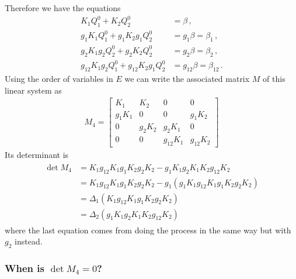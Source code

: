 Therefore we have the equations
\begin{align}
	 K_1 Q_1^0 +  K_2 Q_2^0 &= \beta\,,\\
	 g_1K_1 Q_1^0 + g_1K_2 g_1Q_2^0 &= g_1\beta = \beta_1\,,\\
	 g_2K_1 g_2Q_2^0 + g_2K_2 Q_2^0 &= g_2\beta = \beta_2\,,\\
	 g_{12}K_1 g_2Q_1^0 + g_{12}K_2 g_1Q_2^0 &= g_{12}\beta = \beta_{12}\,.
\end{align}
Using the order of variables in $E$ we can write the associated matrix $M$ of this linear system as
\begin{align}
	M_4 = \begin{bmatrix}
	K_1 & K_2 & 0 & 0 \\
	g_1 K_1 & 0 & 0 & g_1 K_2\\
	0 & g_2 K_2 & g_2 K_1 & 0\\
	0 & 0 & g_{12}K_1 & g_{12} K_2
	\end{bmatrix}
\end{align}
Its determinant is
\begin{align}\begin{split}
	\det M_4 &= K_1 g_{12}K_1 g_1K_2g_2K_2 -g_1K_1g_2K_1K_2g_{12}K_2\\
	& = K_1 g_{12}K_1 g_1K_2g_2K_2  -g_1(g_1K_1g_{12}K_1g_1K_2g_{2}K_2)\\
	&=\Delta_1  (K_1 g_{12}K_1 g_1K_2g_2K_2)\\
	&=\Delta_2 (g_1 K_1 g_2 K_1K_2 g_{12} K_2 )
\end{split}\end{align}
where the last equation comes from doing the process in the same way but with $g_2$ instead.

\subsubsection{When is $\det M_4 = 0$?}


